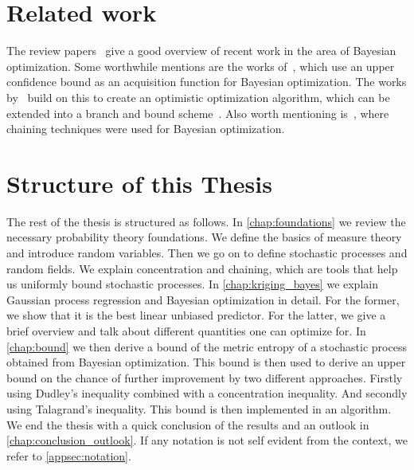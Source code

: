 \section{Related work}
The review papers~\cite{shahriari2015taking,frazier2018tutorial} give a good overview of recent work in the area of Bayesian optimization.
Some worthwhile mentions are the works of~\cite{auer2002using,srinivas2009gaussian}, which use an upper confidence bound as an acquisition function for Bayesian optimization. 
The works by~\cite{munos2011optimistic,wang2014bayesian} build on this to create an optimistic optimization algorithm, which can be extended into a branch and bound scheme~\cite{de2012exponential}. Also worth mentioning is~\cite{contal2015optimization}, where chaining techniques were used for Bayesian optimization.








\section{Structure of this Thesis}
The rest of the thesis is structured as follows.
In \cref{chap:foundations} we review the necessary probability theory foundations. We define the basics of measure theory and introduce random variables. Then we go on to define stochastic processes and random fields. We explain concentration and chaining, which are tools that help us uniformly bound stochastic processes.
In \cref{chap:kriging_bayes} we explain Gaussian process regression and Bayesian optimization in detail. For the former, we show that it is the best linear unbiased predictor. For the latter, we give a brief overview and talk about different quantities one can optimize for.
In \cref{chap:bound} we then derive a bound of the metric entropy of a stochastic process obtained from Bayesian optimization. This bound is then used to derive an upper bound on the chance of further improvement by two different approaches. Firstly using Dudley's inequality combined with a concentration inequality. And secondly using Talagrand's inequality.
This bound is then implemented in an algorithm.
We end the thesis with a quick conclusion of the results and an outlook in \cref{chap:conclusion_outlook}.
If any notation is not self evident from the context, we refer to \cref{appsec:notation}.